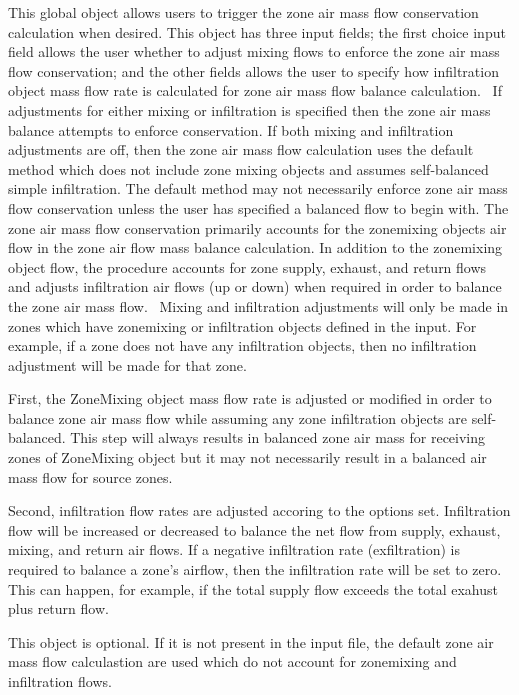 This global object allows users to trigger the zone air mass flow conservation calculation when desired. This object has three input fields; the first choice input field allows the user whether to adjust mixing flows to enforce the zone air mass flow conservation; and the other fields allows the user to specify how infiltration object mass flow rate is calculated for zone air mass flow balance calculation.~ If adjustments for either mixing or infiltration is specified then the zone air mass balance attempts to enforce conservation. If both mixing and infiltration adjustments are off, then the zone air mass flow calculation uses the default method which does not include zone mixing objects and assumes self-balanced simple infiltration. The default method may not necessarily enforce zone air mass flow conservation unless the user has specified a balanced flow to begin with. The zone air mass flow conservation primarily accounts for the zonemixing objects air flow in the zone air flow mass balance calculation. In addition to the zonemixing object flow, the procedure accounts for zone supply, exhaust, and return flows and adjusts infiltration air flows (up or down) when required in order to balance the zone air mass flow.~ Mixing and infiltration adjustments will only be made in zones which have zonemixing or infiltration objects defined in the input. For example, if a zone does not have any infiltration objects, then no infiltration adjustment will be made for that zone.

First, the ZoneMixing object mass flow rate is adjusted or modified in order to balance zone air mass flow while assuming any zone infiltration objects are self-balanced. This step will always results in balanced zone air mass for receiving zones of ZoneMixing object but it may not necessarily result in a balanced air mass flow for source zones.~

Second, infiltration flow rates are adjusted accoring to the options set. Infiltration flow will be increased or decreased to balance the net flow from supply, exhaust, mixing, and return air flows. If a negative infiltration rate (exfiltration) is required to balance a zone's airflow, then the infiltration rate will be set to zero. This can happen, for example, if the total supply flow exceeds the total exahust plus return flow.

This object is optional. If it is not present in the input file, the default zone air mass flow calculastion are used which do not account for zonemixing and infiltration flows.

